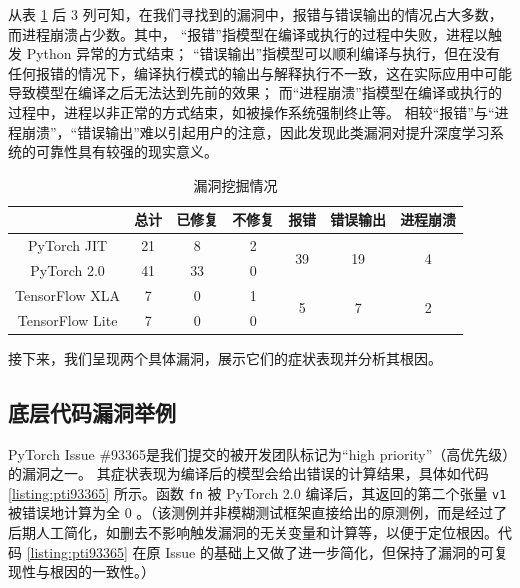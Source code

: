 从表 \ref{tab:bugs} 后 3 列可知，在我们寻找到的漏洞中，报错与错误输出的情况占大多数，而进程崩溃占少数。其中，
“报错”指模型在编译或执行的过程中失败，进程以触发 Python 异常的方式结束；
“错误输出”指模型可以顺利编译与执行，但在没有任何报错的情况下，编译执行模式的输出与解释执行不一致，这在实际应用中可能导致模型在编译之后无法达到先前的效果；
而“进程崩溃”指模型在编译或执行的过程中，进程以非正常的方式结束，如被操作系统强制终止等。
相较“报错”与“进程崩溃”，“错误输出”难以引起用户的注意，因此发现此类漏洞对提升深度学习系统的可靠性具有较强的现实意义。

\begin{table}[]
\centering
\caption{漏洞挖掘情况}
\label{tab:bugs}
\begin{tabular}{ccccccc}
  \toprule
                  & 总计 & 已修复 & 不修复 & 报错                  & 错误输出                & 进程崩溃               \\ \midrule
  PyTorch JIT     & 21 & 8   & 2   & \multirow{2}{*}{39} & \multirow{2}{*}{19} & \multirow{2}{*}{4} \\
  PyTorch 2.0     & 41 & 33  & 0   &                     &                     &                    \\ \cmidrule(lr){1-7} 
  TensorFlow XLA  & 7  & 0   & 1   & \multirow{2}{*}{5}  & \multirow{2}{*}{7}  & \multirow{2}{*}{2} \\
  TensorFlow Lite & 7  & 0   & 0   &                     &                     &                    \\ \bottomrule
\end{tabular}
\end{table}

接下来，我们呈现两个具体漏洞，展示它们的症状表现并分析其根因。

\subsection{底层代码漏洞举例}

PyTorch Issue \#93365\cite{pti93365}是我们提交的被开发团队标记为“high priority”（高优先级）的漏洞之一。
其症状表现为编译后的模型会给出错误的计算结果，具体如代码 \ref{listing:pti93365} 所示。函数 \texttt{fn} 被 PyTorch 2.0 编译后，其返回的第二个张量 \texttt{v1} 被错误地计算为全 0 。（该测例并非模糊测试框架直接给出的原测例，而是经过了后期人工简化，如删去不影响触发漏洞的无关变量和计算等，以便于定位根因。代码 \ref{listing:pti93365} 在原 Issue 的基础上又做了进一步简化，但保持了漏洞的可复现性与根因的一致性。）

